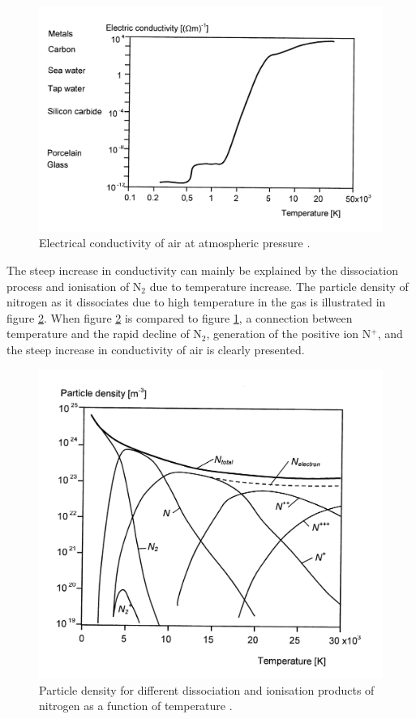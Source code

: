 \documentclass[10pt,b5paper,twoside]{article}
\begin{document}
\begin{figure}[H]
\centering
\includegraphics[scale=0.9]{Bilder/Theory/airConduct.png}
\caption{Electrical conductivity of air at atmospheric pressure \cite{bib:HVEbreak}.} \label{fig:condAir}
\end{figure}

The steep increase in conductivity can mainly be explained by the dissociation process and ionisation of N$_2$ due to temperature increase. The particle density of nitrogen as it dissociates due to high temperature in the gas is illustrated in figure \ref{fig:Ndensi}. When figure \ref{fig:Ndensi} is compared to figure \ref{fig:condAir}, a connection between temperature and the rapid decline of N$_2$, generation of the positive ion N$^+$, and the steep increase in conductivity of air is clearly presented.

\begin{figure}[H]
\centering
\includegraphics[scale=0.8]{Bilder/Theory/particleDensNit.png}
\caption{Particle density for different dissociation and ionisation products of nitrogen as a function of temperature \cite{bib:HVEbreak}.} \label{fig:Ndensi}
\end{figure}
\end{document}
